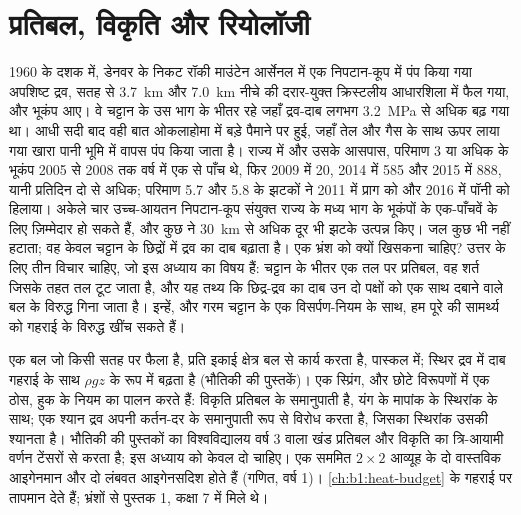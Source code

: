 \chapter{प्रतिबल, विकृति और रियोलॉजी}\label{ch:b1:stress-strain-rheology}

1960 के दशक में, डेनवर के निकट रॉकी माउंटेन आर्सेनल में एक निपटान-कूप में पंप किया गया अपशिष्ट द्रव, सतह से \qty{3.7}{km} और \qty{7.0}{km} नीचे की दरार-युक्त क्रिस्टलीय आधारशिला में फैल गया, और भूकंप आए। वे चट्टान के उस भाग के भीतर रहे जहाँ द्रव-दाब लगभग \qty{3.2}{MPa} से अधिक बढ़ गया था।
आधी सदी बाद वही बात ओकलाहोमा में बड़े पैमाने पर हुई, जहाँ तेल और गैस के साथ ऊपर लाया गया खारा पानी भूमि में वापस पंप किया जाता है। राज्य में और उसके आसपास, परिमाण 3 या अधिक के भूकंप 2005 से 2008 तक वर्ष में एक से पाँच थे, फिर 2009 में \num{20}, 2014 में \num{585} और 2015 में \num{888}, यानी प्रतिदिन दो से अधिक; परिमाण 5.7 और 5.8 के झटकों ने 2011 में प्राग को और 2016 में पॉनी को हिलाया। अकेले चार उच्च-आयतन निपटान-कूप संयुक्त राज्य के मध्य भाग के भूकंपों के एक-पाँचवें के लिए ज़िम्मेदार हो सकते हैं, और कुछ ने \qty{30}{km} से अधिक दूर भी झटके उत्पन्न किए।
जल कुछ भी नहीं हटाता; वह केवल चट्टान के छिद्रों में द्रव का दाब बढ़ाता है। एक भ्रंश को क्यों खिसकना चाहिए? उत्तर के लिए तीन विचार चाहिए, जो इस अध्याय का विषय हैं: चट्टान के भीतर एक तल पर प्रतिबल, वह शर्त जिसके तहत तल टूट जाता है, और यह तथ्य कि छिद्र-द्रव का दाब उन दो पक्षों को एक साथ दबाने वाले बल के विरुद्ध गिना जाता है। इन्हें, और गरम चट्टान के एक विसर्पण-नियम के साथ, हम पूरे  की सामर्थ्य को गहराई के विरुद्ध खींच सकते हैं।

\begin{recall}
एक बल जो किसी सतह पर फैला है, प्रति इकाई क्षेत्र बल से कार्य करता है, पास्कल में; स्थिर द्रव में दाब गहराई के साथ $\rho g z$ के रूप में बढ़ता है (भौतिकी की पुस्तकें)। एक स्प्रिंग, और छोटे विरूपणों में एक ठोस, हुक के नियम का पालन करते हैं: विकृति प्रतिबल के समानुपाती है, यंग के मापांक के स्थिरांक के साथ; एक श्यान द्रव अपनी कर्तन-दर के समानुपाती रूप से विरोध करता है, जिसका स्थिरांक उसकी श्यानता है। भौतिकी की पुस्तकों का विश्वविद्यालय वर्ष 3 वाला खंड प्रतिबल और विकृति का त्रि-आयामी वर्णन टेंसरों से करता है; इस अध्याय को केवल दो चाहिए। एक सममित $2\times2$ आव्यूह के दो वास्तविक आइगेनमान और दो लंबवत आइगेनसदिश होते हैं (गणित, वर्ष 1)। \cref{ch:b1:heat-budget} के  गहराई पर तापमान देते हैं; भ्रंशों से पुस्तक 1, कक्षा 7 में मिले थे।
\end{recall}

